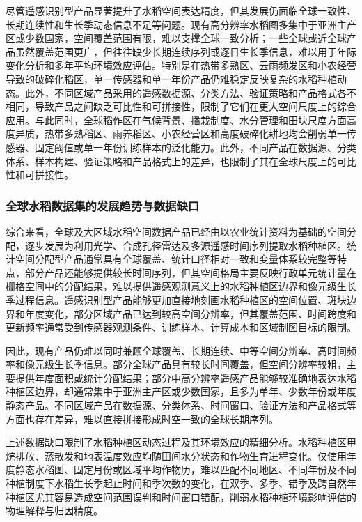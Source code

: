 尽管遥感识别型产品显著提升了水稻空间表达精度，但其发展仍面临全球一致性、长期连续性和生长季动态信息不足等问题。现有高分辨率水稻图多集中于亚洲主产区或少数国家，空间覆盖范围有限，难以支撑全球一致分析；一些全球或近全球产品虽然覆盖范围更广，但往往缺少长期连续序列或逐日生长季信息，难以用于年际变化分析和多年平均环境效应评估。特别是在热带多熟区、云雨频发区和小农经营导致的破碎化稻区，单一传感器和单一年份产品仍难稳定反映复杂的水稻种植动态。此外，不同区域产品采用的遥感数据源、分类方法、验证策略和产品格式各不相同，导致产品之间缺乏可比性和可拼接性，限制了它们在更大空间尺度上的综合应用。与此同时，全球稻作区在气候背景、播栽制度、水分管理和田块尺度方面高度异质，热带多熟稻区、雨养稻区、小农经营区和高度破碎化耕地均会削弱单一传感器、固定阈值或单一年份训练样本的泛化能力\cite{Lesiv2019FieldSize}。此外，不同产品在数据源、分类体系、样本构建、验证策略和产品格式上的差异，也限制了其在全球尺度上的可比性和可拼接性。

\subsubsection{全球水稻数据集的发展趋势与数据缺口}

综合来看，全球及大区域水稻空间数据产品已经由以农业统计资料为基础的空间分配，逐步发展为利用光学、合成孔径雷达及多源遥感时间序列提取水稻种植区。统计空间分配型产品通常具有全球覆盖、统计口径相对一致和变量体系较完整等特点，部分产品还能够提供较长时间序列，但其空间格局主要反映行政单元统计量在栅格空间中的分配结果，难以提供遥感观测意义上的水稻种植区边界和像元级生长季过程信息。遥感识别型产品能够更加直接地刻画水稻种植区的空间位置、斑块边界和年度变化，部分区域产品已达到较高空间分辨率，但其覆盖范围、时间跨度和更新频率通常受到传感器观测条件、训练样本、计算成本和区域制图目标的限制。

因此，现有产品仍难以同时兼顾全球覆盖、长期连续、中等空间分辨率、高时间频率和像元级生长季信息。部分全球产品具有较长时间覆盖，但空间分辨率较粗，主要提供年度面积或统计分配结果；部分中高分辨率遥感产品能够较准确地表达水稻种植区边界，却通常集中于亚洲主产区或少数国家，且多为单年、少数年份或年度静态产品。不同区域产品在数据源、分类体系、时间窗口、验证方法和产品格式等方面也存在差异，难以直接拼接形成时空一致的全球长期序列。

上述数据缺口限制了水稻种植区动态过程及其环境效应的精细分析。水稻种植区甲烷排放\cite{Zhang2020NatCommun,Qian2023RiceGHG}、蒸散发和地表温度效应\cite{Xue2021RemoteSensing,Liu2022AgForMet}均随田间水分状态和作物生育进程变化。仅使用年度静态水稻图、固定月份或区域平均作物历\cite{Portmann2010MIRCA,Sacks2010GEB}，难以匹配不同地区、不同年份及不同种植制度下水稻生长季起止时间和季次数的变化，在双季、多季、错季及跨自然年种植区尤其容易造成空间范围误判和时间窗口错配，削弱水稻种植环境影响评估的物理解释与归因精度。

